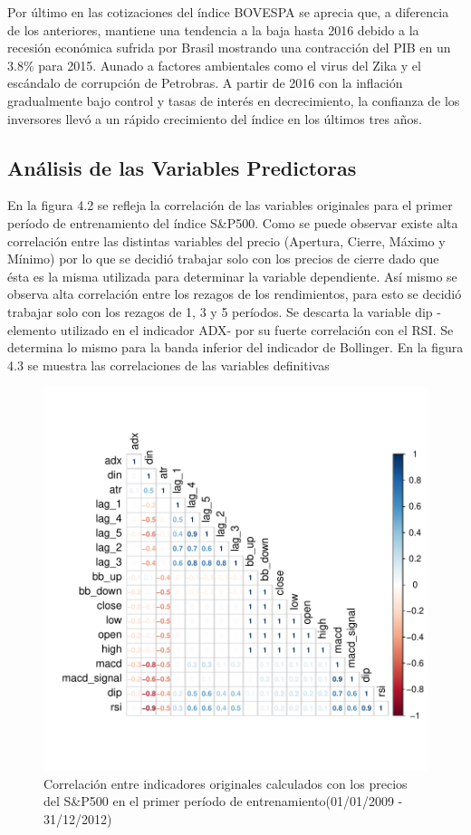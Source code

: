 \documentclass[a4paper,12pt]{Latex/Classes/PhDthesisPSnPDF}
\begin{document}
Por último en las cotizaciones del índice BOVESPA se aprecia que, a diferencia de los anteriores, mantiene una tendencia a la baja hasta 2016 debido a la recesión económica sufrida por Brasil mostrando una contracción del PIB en un 3.8\% para 2015. Aunado a factores ambientales como el virus del Zika y el escándalo de corrupción de Petrobras. A partir de 2016 con la inflación gradualmente bajo control y tasas de interés en decrecimiento, la confianza de los inversores llevó a un rápido crecimiento del índice en los últimos tres años.

\subsection{Análisis de las Variables Predictoras}

En la figura 4.2 se refleja la correlación de las variables originales para el primer período de entrenamiento del índice S\&P500. Como se puede observar existe alta correlación entre las distintas variables del precio (Apertura, Cierre, Máximo y Mínimo) por lo que se decidió trabajar solo con los precios de cierre dado que ésta es la misma utilizada para determinar la variable dependiente. Así mismo se observa alta correlación entre los rezagos de los rendimientos, para esto se decidió trabajar solo con los rezagos de 1, 3 y 5 períodos. Se descarta la variable dip -elemento utilizado en el indicador ADX- por su fuerte correlación con el RSI. Se determina lo mismo para la banda inferior del indicador de Bollinger. En la figura 4.3 se muestra las correlaciones de las variables definitivas

\begin{figure}[H]
\centering
\includegraphics{main-006}
\caption{Correlación entre indicadores originales calculados con los precios del S\&P500 en el primer período de entrenamiento(01/01/2009 - 31/12/2012)}
\end{figure}
\end{document}
